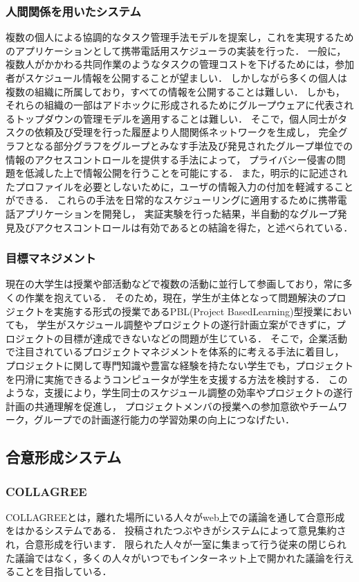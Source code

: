 \subsubsection{人間関係を用いたシステム}
複数の個人による協調的なタスク管理手法モデル\cite{scheduler}を提案し，これを実現するためのアプリケーションとして携帯電話用スケジューラの実装を行った．
一般に，複数人がかかわる共同作業のようなタスクの管理コストを下げるためには，参加者がスケジュール情報を公開することが望ましい．
しかしながら多くの個人は複数の組織に所属しており，すべての情報を公開することは難しい．
しかも，それらの組織の一部はアドホックに形成されるためにグループウェアに代表されるトップダウンの管理モデルを適用することは難しい．
そこで，個人同士がタスクの依頼及び受理を行った履歴より人間関係ネットワークを生成し，
完全グラフとなる部分グラフをグループとみなす手法及び発見されたグループ単位での情報のアクセスコントロールを提供する手法によって，
プライバシー侵害の問題を低減した上で情報公開を行うことを可能にする．
また，明示的に記述されたプロファイルを必要としないために，ユーザの情報入力の付加を軽減することができる．
これらの手法を日常的なスケジューリングに適用するために携帯電話アプリケーションを開発し，
実証実験を行った結果，半自動的なグループ発見及びアクセスコントロールは有効であるとの結論を得た，と述べられている．

\subsubsection{目標マネジメント}
現在の大学生は授業や部活動などで複数の活動に並行して参画しており，常に多くの作業を抱えている．
そのため，現在，学生が主体となって問題解決のプロジェクトを実施する形式の授業であるPBL(Project BasedLearning)型授業においても，
学生がスケジュール調整やプロジェクトの遂行計画立案ができずに，プロジェクトの目標が達成できないなどの問題が生じている．
そこで，企業活動で注目されているプロジェクトマネジメントを体系的に考える手法に着目し，
プロジェクトに関して専門知識や豊富な経験を持たない学生でも，プロジェクトを円滑に実施できるようコンピュータが学生を支援する方法\cite{management}を検討する．
このような，支援により，学生同士のスケジュール調整の効率やプロジェクトの遂行計画の共通理解を促進し，
プロジェクトメンバの授業への参加意欲やチームワーク，グループでの計画遂行能力の学習効果の向上につなげたい．

\subsection{合意形成システム}

\subsubsection{COLLAGREE}
COLLAGREE\cite{ito2016}とは，離れた場所にいる人々がweb上での議論を通して合意形成をはかるシステムである．
投稿されたつぶやきがシステムによって意見集約され，合意形成を行います．
限られた人々が一室に集まって行う従来の閉じられた議論ではなく，多くの人々がいつでもインターネット上で開かれた議論を行えることを目指している．

